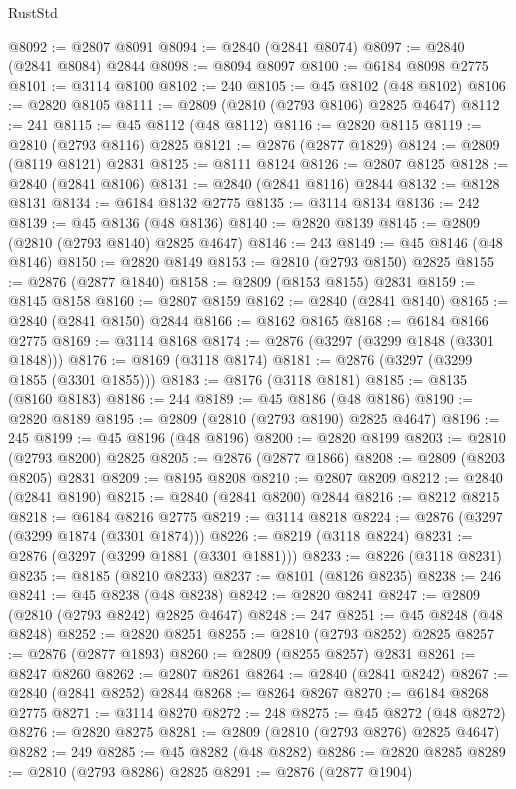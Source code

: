 \begin{lexlean}{RustStd}
\begin{coremodule}
@8092 := @2807 @8091
@8094 := @2840 (@2841 @8074)
@8097 := @2840 (@2841 @8084) @2844
@8098 := @8094 @8097
@8100 := @6184 @8098 @2775
@8101 := @3114 @8100
@8102 := 240
@8105 := @45 @8102 (@48 @8102)
@8106 := @2820 @8105
@8111 := @2809 (@2810 (@2793 @8106) @2825 @4647)
@8112 := 241
@8115 := @45 @8112 (@48 @8112)
@8116 := @2820 @8115
@8119 := @2810 (@2793 @8116) @2825
@8121 := @2876 (@2877 @1829)
@8124 := @2809 (@8119 @8121) @2831
@8125 := @8111 @8124
@8126 := @2807 @8125
@8128 := @2840 (@2841 @8106)
@8131 := @2840 (@2841 @8116) @2844
@8132 := @8128 @8131
@8134 := @6184 @8132 @2775
@8135 := @3114 @8134
@8136 := 242
@8139 := @45 @8136 (@48 @8136)
@8140 := @2820 @8139
@8145 := @2809 (@2810 (@2793 @8140) @2825 @4647)
@8146 := 243
@8149 := @45 @8146 (@48 @8146)
@8150 := @2820 @8149
@8153 := @2810 (@2793 @8150) @2825
@8155 := @2876 (@2877 @1840)
@8158 := @2809 (@8153 @8155) @2831
@8159 := @8145 @8158
@8160 := @2807 @8159
@8162 := @2840 (@2841 @8140)
@8165 := @2840 (@2841 @8150) @2844
@8166 := @8162 @8165
@8168 := @6184 @8166 @2775
@8169 := @3114 @8168
@8174 := @2876 (@3297 (@3299 @1848 (@3301 @1848)))
@8176 := @8169 (@3118 @8174)
@8181 := @2876 (@3297 (@3299 @1855 (@3301 @1855)))
@8183 := @8176 (@3118 @8181)
@8185 := @8135 (@8160 @8183)
@8186 := 244
@8189 := @45 @8186 (@48 @8186)
@8190 := @2820 @8189
@8195 := @2809 (@2810 (@2793 @8190) @2825 @4647)
@8196 := 245
@8199 := @45 @8196 (@48 @8196)
@8200 := @2820 @8199
@8203 := @2810 (@2793 @8200) @2825
@8205 := @2876 (@2877 @1866)
@8208 := @2809 (@8203 @8205) @2831
@8209 := @8195 @8208
@8210 := @2807 @8209
@8212 := @2840 (@2841 @8190)
@8215 := @2840 (@2841 @8200) @2844
@8216 := @8212 @8215
@8218 := @6184 @8216 @2775
@8219 := @3114 @8218
@8224 := @2876 (@3297 (@3299 @1874 (@3301 @1874)))
@8226 := @8219 (@3118 @8224)
@8231 := @2876 (@3297 (@3299 @1881 (@3301 @1881)))
@8233 := @8226 (@3118 @8231)
@8235 := @8185 (@8210 @8233)
@8237 := @8101 (@8126 @8235)
@8238 := 246
@8241 := @45 @8238 (@48 @8238)
@8242 := @2820 @8241
@8247 := @2809 (@2810 (@2793 @8242) @2825 @4647)
@8248 := 247
@8251 := @45 @8248 (@48 @8248)
@8252 := @2820 @8251
@8255 := @2810 (@2793 @8252) @2825
@8257 := @2876 (@2877 @1893)
@8260 := @2809 (@8255 @8257) @2831
@8261 := @8247 @8260
@8262 := @2807 @8261
@8264 := @2840 (@2841 @8242)
@8267 := @2840 (@2841 @8252) @2844
@8268 := @8264 @8267
@8270 := @6184 @8268 @2775
@8271 := @3114 @8270
@8272 := 248
@8275 := @45 @8272 (@48 @8272)
@8276 := @2820 @8275
@8281 := @2809 (@2810 (@2793 @8276) @2825 @4647)
@8282 := 249
@8285 := @45 @8282 (@48 @8282)
@8286 := @2820 @8285
@8289 := @2810 (@2793 @8286) @2825
@8291 := @2876 (@2877 @1904)

\end{coremodule}
\end{lexlean}
